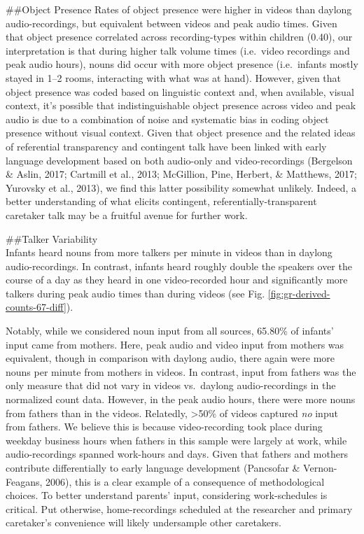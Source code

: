 \documentclass[man]{apa6}
\theoremstyle{definition}
\theoremstyle{definition}
\theoremstyle{definition}
\theoremstyle{remark}
\begin{document}
\#\#Object Presence Rates of object presence were higher in videos than
daylong audio-recordings, but equivalent between videos and peak audio
times. Given that object presence correlated across recording-types
within children (0.40), our interpretation is that during higher talk
volume times (i.e.~video recordings and peak audio hours), nouns did
occur with more object presence (i.e.~infants mostly stayed in 1--2
rooms, interacting with what was at hand). However, given that object
presence was coded based on linguistic context and, when available,
visual context, it's possible that indistinguishable object presence
across video and peak audio is due to a combination of noise and
systematic bias in coding object presence without visual context. Given
that object presence and the related ideas of referential transparency
and contingent talk have been linked with early language development
based on both audio-only and video-recordings (Bergelson \& Aslin, 2017;
Cartmill et al., 2013; McGillion, Pine, Herbert, \& Matthews, 2017;
Yurovsky et al., 2013), we find this latter possibility somewhat
unlikely. Indeed, a better understanding of what elicits contingent,
referentially-transparent caretaker talk may be a fruitful avenue for
further work.

\#\#Talker Variability\\
Infants heard nouns from more talkers per minute in videos than in
daylong audio-recordings. In contrast, infants heard roughly double the
speakers over the course of a day as they heard in one video-recorded
hour and significantly more talkers during peak audio times than during
videos (see Fig. \ref{fig:gr-derived-counts-67-diff}).

Notably, while we considered noun input from all sources, 65.80\% of
infants' input came from mothers. Here, peak audio and video input from
mothers was equivalent, though in comparison with daylong audio, there
again were more nouns per minute from mothers in videos. In contrast,
input from fathers was the only measure that did not vary in videos
vs.~daylong audio-recordings in the normalized count data. However, in
the peak audio hours, there were more nouns from fathers than in the
videos. Relatedly, \textgreater{}50\% of videos captured \emph{no} input
from fathers. We believe this is because video-recording took place
during weekday business hours when fathers in this sample were largely
at work, while audio-recordings spanned work-hours and days. Given that
fathers and mothers contribute differentially to early language
development (Pancsofar \& Vernon-Feagans, 2006), this is a clear example
of a consequence of methodological choices. To better understand
parents' input, considering work-schedules is critical. Put otherwise,
home-recordings scheduled at the researcher and primary caretaker's
convenience will likely undersample other caretakers.
\end{document}
